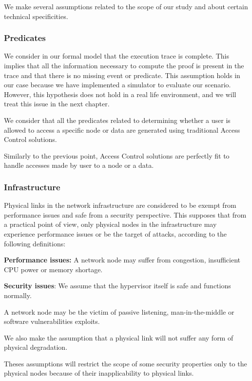 We make several assumptions related to the scope of our study and about certain technical specificities.

\subsubsection{Predicates}
We consider in our formal model that the execution trace is complete.
This implies that all the information necessary to compute the proof is present in the trace and that there is no missing event or predicate.
This assumption holds in our case because we have implemented a simulator to evaluate our scenario. However, this hypothesis does not hold in a real life environment, and we will treat this issue in the next chapter.

We consider that all the predicates related to determining whether a user is allowed to access a specific node or data are generated using traditional Access Control solutions.

Similarly to the previous point, Access Control solutions are perfectly fit to handle accesses made by user to a node or a data.


\subsubsection{Infrastructure}
Physical links in the network infrastructure are considered to be exempt from performance issues and safe from a security perspective.
This supposes that from a practical point of view, only physical nodes in the infrastructure may experience performance issues or be the target of attacks, according to the following definitions:

\textbf{Performance issues:} A network node may suffer from congestion, insufficient CPU power or memory shortage. 

\textbf{Security issues}: We assume that the hypervisor itself is safe and functions normally.

A network node may be the victim of passive listening, man-in-the-middle or software vulnerabilities exploits.

We also make the assumption that a physical link will not suffer any form of physical degradation.

Theses assumptions will restrict the scope of some security properties only to the physical nodes because of their inapplicability to physical links.

